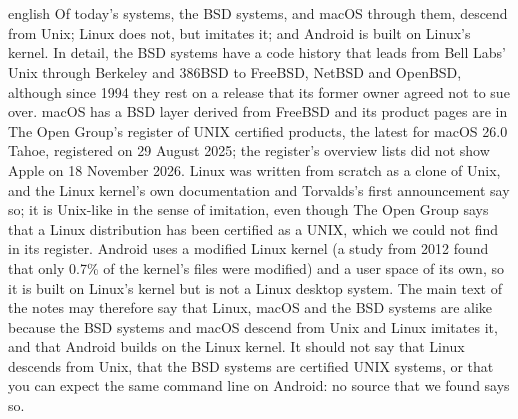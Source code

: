 \section{} %

\begin{onlyin}{english} %
Of today's systems, the BSD systems, and macOS through them, descend from
Unix; Linux does not, but imitates it; and Android is built on Linux's
kernel.
In detail, the BSD systems have a code history that leads from Bell
Labs' Unix through Berkeley and 386BSD to FreeBSD, NetBSD and OpenBSD,
although since 1994 they rest on a release that its former owner agreed
not to sue over.
macOS has a BSD layer derived from FreeBSD and its product pages are in
The Open Group's register of UNIX certified products, the latest for
macOS 26.0 Tahoe, registered on 29 August 2025; the register's overview
lists did not show Apple on 18 November 2026.
Linux was written from scratch as a clone of Unix, and the Linux kernel's
own documentation and Torvalds's first announcement say so; it is
Unix-like in the sense of imitation, even though The Open Group says
that a Linux distribution has been certified as a UNIX, which we could
not find in its register.
Android uses a modified Linux kernel (a study from 2012 found that
only 0.7\% of the kernel's files were modified) and a user space of its
own, so it is built on Linux's kernel but is not a Linux desktop system.
The main text of the notes may therefore say that Linux, macOS and the
BSD
systems are alike because the BSD systems and macOS descend from Unix and
Linux imitates it, and that Android builds on the Linux kernel.
It should not say that Linux descends from Unix, that the BSD systems
are certified UNIX systems, or that you can expect the same command line
on Android: no source that we found says so.
\end{onlyin}
